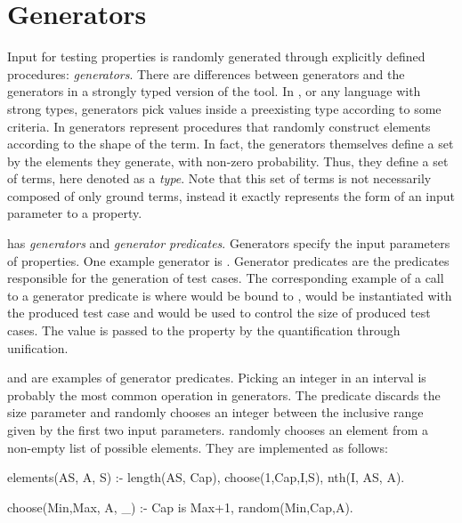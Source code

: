 

\section{Generators}
\label{sec:generators}

Input for testing properties is randomly generated through explicitly
defined procedures: \emph{generators}.
%
There are  differences between \plqc{} generators and the
generators in a strongly typed version of the tool.
%
In \Haskell{} \QuickCheck{}, or any language with strong types,
generators pick values inside a preexisting type according to some criteria.
%
In \plqc{} generators represent procedures that randomly construct
elements according to the shape of the term.
%
In fact, the generators themselves define a set by the elements they
generate, with non-zero probability.
%
Thus, they define a set of terms, here denoted as a \emph{type}.
%
Note that this set of terms is not necessarily composed of only ground
terms, instead it exactly represents the form of an input parameter to a
property.



\plqc{} has {\it generators} and {\it generator
predicates}.
%
Generators specify the input parameters of properties.
%
One example generator is .
%
Generator predicates are the predicates responsible for the generation
of test cases.
%
The corresponding example of a call to a generator predicate is  where  would be bound to ,
 would be instantiated with the produced test case and
 would be used to control the size of produced test cases.
%
The value is passed to the property by the \plqc{} quantification
through unification.


   and  are examples of generator
predicates.
%
Picking an integer in an interval is probably the most common operation
in generators.
%
The  predicate discards the size parameter and randomly
chooses an integer between the inclusive range given by the first two
input parameters.
%
  randomly chooses an element from a non-empty list of
possible elements.
%
They are implemented as follows:
\begin{yapcode}
 elements(AS, A, S) :-
   length(AS, Cap), choose(1,Cap,I,S), nth(I, AS, A).

 choose(Min,Max, A, _) :- Cap is Max+1, random(Min,Cap,A).
\end{yapcode}



